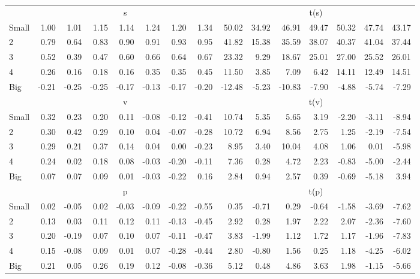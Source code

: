 \begin{table}[!ht]
\begin{tabular}{lrrrrrrrrrrrrrr}
  
     & \multicolumn{7}{c}{s} & \multicolumn{7}{c}{t(s)}   \\
     \cmidrule(r){2-8} \cmidrule(r){9-15} 
    Small  & 1.00  & 1.01  & 1.15  & 1.14  & 1.24  & 1.20  & 1.34  & 50.02  & 34.92  & 46.91  & 49.47  & 50.32  & 47.74  & 43.17   \\
    2  & 0.79  & 0.64  & 0.83  & 0.90  & 0.91  & 0.93  & 0.95  & 41.82  & 15.38  & 35.59  & 38.07  & 40.37  & 41.04  & 37.44   \\
    3  & 0.52  & 0.39  & 0.47  & 0.60  & 0.66  & 0.64  & 0.67  & 23.32  & 9.29  & 18.67  & 25.01  & 27.00  & 25.52  & 26.01   \\
    4  & 0.26  & 0.16  & 0.18  & 0.16  & 0.35  & 0.35  & 0.45  & 11.50  & 3.85  & 7.09  & 6.42  & 14.11  & 12.49  & 14.51   \\
    Big  & -0.21  & -0.25  & -0.25  & -0.17  & -0.13  & -0.17  & -0.20  & -12.48  & -5.23  & -10.83  & -7.90  & -4.88  & -5.74  & -7.29   \\
    
  
     & \multicolumn{7}{c}{v} & \multicolumn{7}{c}{t(v)}   \\
     \cmidrule(r){2-8} \cmidrule(r){9-15} 
    Small  & 0.32  & 0.23  & 0.20  & 0.11  & -0.08  & -0.12  & -0.41  & 10.74  & 5.35  & 5.65  & 3.19  & -2.20  & -3.11  & -8.94   \\
    2  & 0.30  & 0.42  & 0.29  & 0.10  & 0.04  & -0.07  & -0.28  & 10.72  & 6.94  & 8.56  & 2.75  & 1.25  & -2.19  & -7.54   \\
    3  & 0.29  & 0.21  & 0.37  & 0.14  & 0.04  & 0.00  & -0.23  & 8.95  & 3.40  & 10.04  & 4.08  & 1.06  & 0.01  & -5.98   \\
    4  & 0.24  & 0.02  & 0.18  & 0.08  & -0.03  & -0.20  & -0.11  & 7.36  & 0.28  & 4.72  & 2.23  & -0.83  & -5.00  & -2.44   \\
    Big  & 0.07  & 0.07  & 0.09  & 0.01  & -0.03  & -0.22  & 0.16  & 2.84  & 0.94  & 2.57  & 0.39  & -0.69  & -5.18  & 3.94   \\
    
  
     & \multicolumn{7}{c}{p} & \multicolumn{7}{c}{t(p)}   \\
     \cmidrule(r){2-8} \cmidrule(r){9-15} 
    Small  & 0.02  & -0.05  & 0.02  & -0.03  & -0.09  & -0.22  & -0.55  & 0.35  & -0.71  & 0.29  & -0.64  & -1.58  & -3.69  & -7.62   \\
    2  & 0.13  & 0.03  & 0.11  & 0.12  & 0.11  & -0.13  & -0.45  & 2.92  & 0.28  & 1.97  & 2.22  & 2.07  & -2.36  & -7.60   \\
    3  & 0.20  & -0.19  & 0.07  & 0.10  & 0.07  & -0.11  & -0.47  & 3.83  & -1.99  & 1.12  & 1.72  & 1.17  & -1.96  & -7.83   \\
    4  & 0.15  & -0.08  & 0.09  & 0.01  & 0.07  & -0.28  & -0.44  & 2.80  & -0.80  & 1.56  & 0.25  & 1.18  & -4.25  & -6.02   \\
    Big  & 0.21  & 0.05  & 0.26  & 0.19  & 0.12  & -0.08  & -0.36  & 5.12  & 0.48  & 4.86  & 3.63  & 1.98  & -1.15  & -5.66   \\
    

\end{tabular}
\end{table}
